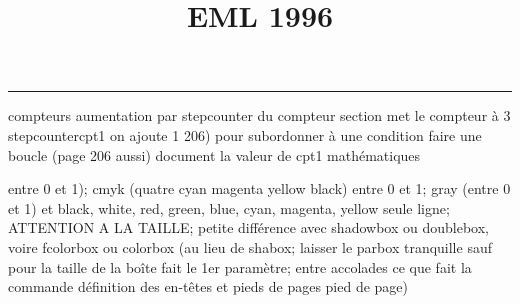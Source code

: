 \documentclass[11pt]{article}%
\title{\bf \vspace{-2cm} EML 1996} %
\author{} %
\date{} %
\renewcommand{\headrulewidth}{0pt}%
\renewcommand{\footrulewidth}{0.4pt}%
\begin{document}
\maketitle %
\vspace{-1.4cm}\hrule %
\thispagestyle{fancy}

\vspace*{.2cm}



compteurs%
aumentation par stepcounter du compteur section%
met le compteur à 3%
stepcounter{cpt1} on ajoute 1%
206) pour subordonner à une condition %
faire une boucle (page 206 aussi) %
document la valeur de cpt1 
mathématiques\newcommand{\ch}{\operatorname{ch}} 
\newcommand{\sh}{\operatorname{sh}}
\renewcommand{\tanh}{\operatorname{th}}
\renewcommand{\sinh}{\operatorname{sh}}
\renewcommand{\cosh}{\operatorname{ch}}
\newcommand{\argsh}{\operatorname{argsh}}
\newcommand{\argch}{\operatorname{argch}}
\newcommand{\argth}{\operatorname{argth}}
\newcommand{\ker}{\operatorname{Ker}}
\renewcommand{\im}{\operatorname{Im}}
\newcommand{\rg}{\operatorname{rg}}
\newcommand{\Id}{\operatorname{Id}}
\newcommand{\id}{\operatorname{id}}
\renewcommand{\leq}{\leq}
\renewcommand{\geq}{\geq }

entre 0 et 1); cmyk (quatre cyan magenta yellow black) entre 0 et 1;
gray (entre 0 et 1) et black, white, red, green, blue, cyan, magenta,
yellow%
seule ligne; ATTENTION A LA TAILLE; petite différence avec shadowbox ou
doublebox, voire fcolorbox ou colorbox (au lieu de shabox; laisser le
parbox tranquille sauf pour la taille de la boîte
\newcommand{\Tbox}[1]{\begin{center} \shabox{\parbox{0.6
\linewidth}{#1}} \end{center}} %
fait le 1er paramètre; entre accolades ce que fait la commande
définition des en-têtes et pieds de pages\pagestyle{fancy}
\chead{}
\rfoot[ \ \thepage]{\thepage}
\cfoot{}
\lfoot{}
\thispagestyle{fancy} %
pied de page)\renewcommand{\footrulewidth}{0.4pt}
\renewcommand{\headrulewidth}{0.4pt}
\end{document}
